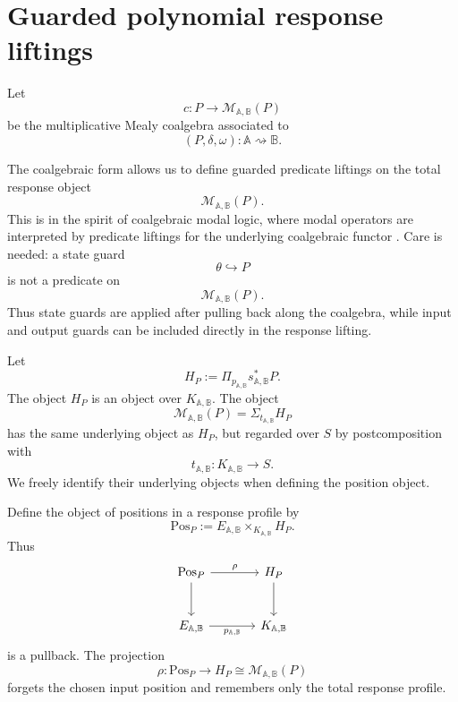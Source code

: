 \section{Guarded polynomial response liftings}
\label{sec:guarded-polynomial-response-liftings}

Let
\[
c:P\to\mathcal M_{\mathbb A,\mathbb B}(P)
\]
be the multiplicative Mealy coalgebra associated to
\[
(P,\delta,\omega):\mathbb A\rightsquigarrow\mathbb B.
\]

The coalgebraic form allows us to define guarded predicate liftings on the
total response object
\[
\mathcal M_{\mathbb A,\mathbb B}(P).
\]
This is in the spirit of coalgebraic modal logic, where modal operators
are interpreted by predicate liftings for the underlying coalgebraic
functor
\cite{PattinsonCoalgebraicModalLogic}.
Care is needed: a state guard
\[
\theta\hookrightarrow P
\]
is not a predicate on
\[
\mathcal M_{\mathbb A,\mathbb B}(P).
\]
Thus state guards are applied after pulling back along the coalgebra,
while input and output guards can be included directly in the response
lifting.

Let
\[
H_P:=
\Pi_{p_{\mathbb A,\mathbb B}}
s_{\mathbb A,\mathbb B}^{\ast}P.
\]
The object \(H_P\) is an object over \(K_{\mathbb A,\mathbb B}\). The
object
\[
\mathcal M_{\mathbb A,\mathbb B}(P)
=
\Sigma_{t_{\mathbb A,\mathbb B}}H_P
\]
has the same underlying object as \(H_P\), but regarded over \(S\) by
postcomposition with
\[
t_{\mathbb A,\mathbb B}:K_{\mathbb A,\mathbb B}\to S.
\]
We freely identify their underlying objects when defining the position
object.

Define the object of positions in a response profile by
\[
\mathrm{Pos}_P
:=
E_{\mathbb A,\mathbb B}\times_{K_{\mathbb A,\mathbb B}}H_P.
\]
Thus
\[
\begin{tikzcd}[column sep=large,row sep=large]
\mathrm{Pos}_P
  \arrow[r, "\rho"]
  \arrow[d]
&
H_P
  \arrow[d]
\\
E_{\mathbb A,\mathbb B}
  \arrow[r, "p_{\mathbb A,\mathbb B}"']
&
K_{\mathbb A,\mathbb B}
\end{tikzcd}
\]
is a pullback. The projection
\[
\rho:\mathrm{Pos}_P\to H_P\cong\mathcal M_{\mathbb A,\mathbb B}(P)
\]
forgets the chosen input position and remembers only the total response
profile.

